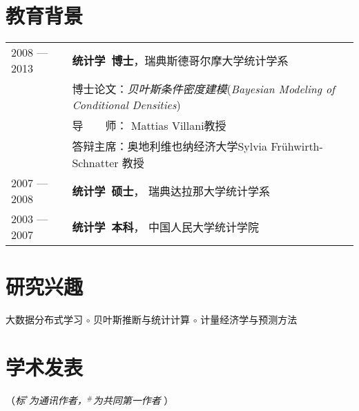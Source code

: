 \documentclass[twoside,a4paper,10pt]{amsart}
\begin{document}
\section*{教育背景}

\begin{tabular}{ l  p{}}
  2008 --- 2013 & \textbf{统计学~博士}，瑞典斯德哥尔摩大学统计学系                                       \\
                & 博士论文：\emph{贝叶斯条件密度建模}(\emph{Bayesian Modeling of Conditional Densities}) \\
                & 导　　师： Mattias Villani教授                                                         \\
                & 答辩主席：奥地利维也纳经济大学Sylvia Frühwirth-Schnatter 教授                          \\
  2007 --- 2008 & \textbf{统计学~硕士}， 瑞典达拉那大学统计学系                                          \\
  2003 --- 2007 & \textbf{统计学~本科}， 中国人民大学统计学院                                            \\
\end{tabular}

\section*{研究兴趣}

大数据分布式学习 $\circ$ 贝叶斯推断与统计计算 $\circ$ 计量经济学与预测方法


\section*{学术发表}
（\emph{标$^*$为通讯作者，$^\#$为共同第一作者} ）
\begin{refsection}
\nocite{kang2021forecast_ejor}
\nocite{pan2021note_jbes}
\nocite{talagala2021fformpp_ijf}
\nocite{zhu2021least_jcgs}
\nocite{wang2021uncertainty_jors}
\nocite{kang2021deja_jbr}
\nocite{hao2020bilinear_ced}
\nocite{li2020forecasting_expert}
\nocite{kang2020gratis_sam}
\nocite{li2020fppcn}
\nocite{kalesan2020intersections_jsr}
\nocite{bailey2019changes_plosone}
\nocite{li2019credit_cef}
\nocite{li2018improving_ijf}
\nocite{pino2018cohort_bmj}
\nocite{li2016distributedcn}
\nocite{li2013bayesian}
\nocite{li2013efficient_sjs}
\nocite{li2011modeling_mixtures}
\nocite{li2010flexible_jspi}
\printbibliography[heading=none]
\end{refsection}
\end{document}
